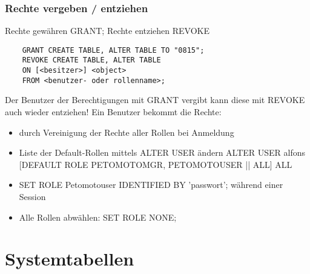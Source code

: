 \documentclass[12pt]{scrreprt}
\begin{document}
\subsection{Rechte vergeben / entziehen}
Rechte gewähren GRANT; Rechte entziehen REVOKE
\begin{lstlisting}
	GRANT CREATE TABLE, ALTER TABLE TO "0815";
	REVOKE CREATE TABLE, ALTER TABLE 
	ON [<besitzer>] <object>
	FROM <benutzer- oder rollenname>;
\end{lstlisting}
Der Benutzer der Berechtigungen mit GRANT vergibt kann diese mit REVOKE auch wieder entziehen!\newline
Ein Benutzer bekommt die Rechte:
\begin{itemize}
\item durch Vereinigung der Rechte aller Rollen bei Anmeldung
\item Liste der Default-Rollen mittels ALTER USER ändern\newline
		ALTER USER alfons [DEFAULT ROLE PETOMOTOMGR, PETOMOTOUSER || ALL]\newline
		ALL 
\item SET ROLE Petomotouser IDENTIFIED BY 'passwort'; während einer Session
\item Alle Rollen abwählen: SET ROLE NONE;
\end{itemize}

\chapter{Systemtabellen}
\end{document}
